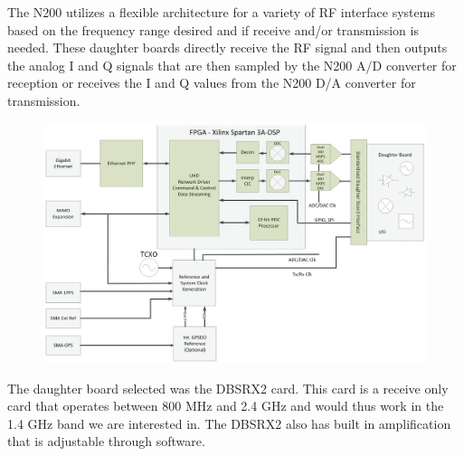 The N200 utilizes a flexible architecture for a variety of RF interface systems based on the frequency range desired and if receive and/or transmission is needed.  These daughter boards directly receive the RF signal and then outputs the analog I and Q signals that are then sampled by the N200 A/D converter for reception or receives the I and Q values from the N200 D/A converter for transmission. 

 {\begin{figure}[h!tb] 
\centering
\includegraphics[width=14cm]{Images/n200_block_edited}
\label{N200_block}
\end{figure}
}

The daughter board selected was the DBSRX2 card.  This card is a receive only card that operates between 800 MHz and 2.4 GHz and would thus work in the 1.4 GHz band we are interested in.  The DBSRX2 also has built in amplification that is adjustable through software.




